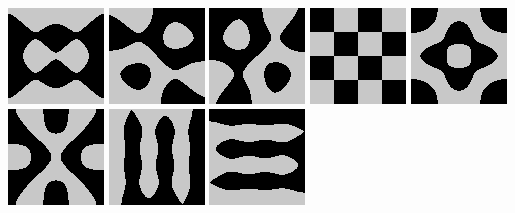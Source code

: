 \includegraphics{o/dchladni_017.png}
\includegraphics{o/dchladni_018.png}
\includegraphics{o/dchladni_019.png}
\includegraphics{o/dchladni_020.png}
\includegraphics{o/dchladni_021.png}
\includegraphics{o/dchladni_022.png}
\includegraphics{o/dchladni_023.png}
\includegraphics{o/dchladni_024.png}

